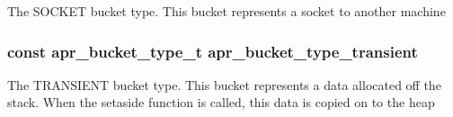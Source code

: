 The S\-O\-C\-K\-E\-T bucket type. This bucket represents a socket to another machine \hypertarget{group___a_p_r___util___bucket___brigades_ga1692ced61c1966e67adc05ec2a69ce9b}{
\subsubsection[{apr\-\_\-bucket\-\_\-type\-\_\-transient}]{\setlength{\rightskip}{0pt plus 5cm}const {\bf apr\-\_\-bucket\-\_\-type\-\_\-t} apr\-\_\-bucket\-\_\-type\-\_\-transient}}\label{group___a_p_r___util___bucket___brigades_ga1692ced61c1966e67adc05ec2a69ce9b}
The T\-R\-A\-N\-S\-I\-E\-N\-T bucket type. This bucket represents a data allocated off the stack. When the setaside function is called, this data is copied on to the heap 